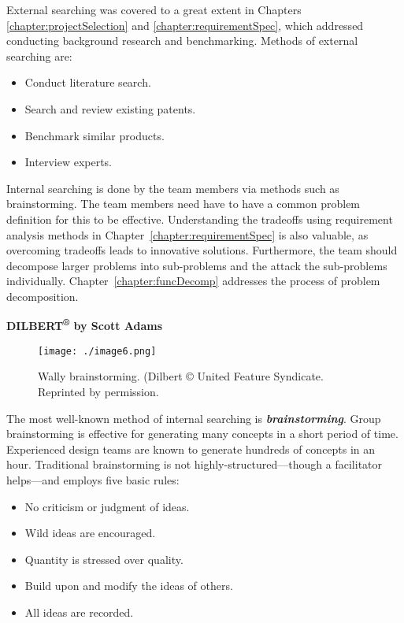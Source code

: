 External searching was covered to a great extent in 
Chapters \ref{chapter:projectSelection} and 
\ref{chapter:requirementSpec},
which addressed conducting background research and benchmarking. Methods
of external searching are:

\begin{itemize}
\item
  Conduct literature search.
\item
  Search and review existing patents.
\item
  Benchmark similar products.
\item
  Interview experts.
\end{itemize}

Internal searching is done by the team members via methods such as
brainstorming. The team members need have to have a common problem
definition for this to be effective. Understanding the tradeoffs using
requirement analysis methods in Chapter~\ref{chapter:requirementSpec} 
is also valuable, as
overcoming tradeoffs leads to innovative solutions. Furthermore, the
team should decompose larger problems into sub-problems and the attack
the sub-problems individually. 
Chapter~\ref{chapter:funcDecomp} addresses the process of
problem decomposition.

\textbf{DILBERT\textsuperscript{®} by Scott Adams}
\begin{figure}
\texttt{[image: ./image6.png]}
\caption{Wally brainstorming. (Dilbert © United
Feature Syndicate. Reprinted by permission.}
\label{figure:dilbertConcept}
\end{figure}

The most well-known method of internal searching is
\emph{\textbf{brainstorming}}. Group brainstorming is effective for
generating many concepts in a short period of time. Experienced design
teams are known to generate hundreds of concepts in an hour. Traditional
brainstorming is not highly-structured---though a facilitator
helps---and employs five basic rules:

\begin{itemize}
\item
  No criticism or judgment of ideas.
\item
  Wild ideas are encouraged.
\item
  Quantity is stressed over quality.
\item
  Build upon and modify the ideas of others.
\item
  All ideas are recorded.
\end{itemize}

